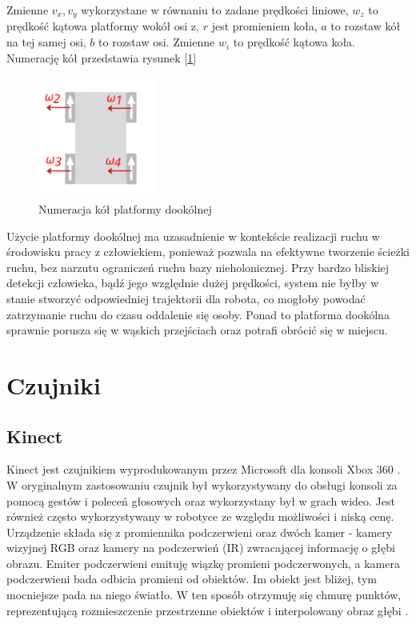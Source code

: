 Zmienne $v_{x}, v_{y}$ wykorzystane w równaniu to zadane prędkości liniowe, $w_{z}$ to prędkość kątowa platformy wokół osi z, $r$ jest promieniem koła, $a$ to rozstaw kół na tej samej osi, $b$ to rozstaw osi. Zmienne $w_{i}$ to prędkość kątowa koła. Numerację kół przedstawia rysunek [\ref{fig:n}]
  	 
\begin{figure}[H]
  	\centering
  	\includegraphics[height=4cm]{gfx/vectors2.png}
    \caption{Numeracja kół platformy dookólnej}
    \label{fig:n}
\end{figure}
        

Użycie platformy dookólnej ma uzasadnienie w kontekście realizacji ruchu w środowisku pracy z człowiekiem, ponieważ pozwala na efektywne tworzenie ścieżki ruchu, bez narzutu ograniczeń ruchu bazy nieholonicznej. Przy bardzo bliskiej detekcji człowieka, bądź jego względnie dużej prędkości, system nie byłby w stanie stworzyć odpowiedniej trajektorii dla robota, co mogłoby powodać zatrzymanie ruchu do czasu oddalenie się osoby. Ponad to platforma dookólna sprawnie porusza się w wąskich przejściach oraz potrafi obrócić się w miejscu. \\


\section{Czujniki}

\subsection{Kinect}

Kinect jest czujnikiem wyprodukowanym przez Microsoft dla konsoli Xbox 360 \cite{kinect2}. W oryginalnym zastosowaniu czujnik był wykorzystywany do obsługi konsoli za pomocą gestów i poleceń głosowych oraz wykorzystany był w grach wideo. Jest również często wykorzystywany w robotyce ze względu możliwości i niską cenę. Urządzenie składa się z promiennika podczerwieni oraz dwóch kamer - kamery wizyjnej RGB oraz kamery na podczerwień (IR) zwracającej informację o głębi obrazu. Emiter podczerwieni emituję wiązkę promieni podczerwonych, a kamera podczerwieni bada odbicia promieni od obiektów. Im obiekt jest bliżej, tym mocniejsze pada na niego światło. W ten sposób otrzymuję się chmurę punktów, reprezentującą rozmieszczenie przestrzenne obiektów i interpolowany obraz głębi \cite{kinect}.

